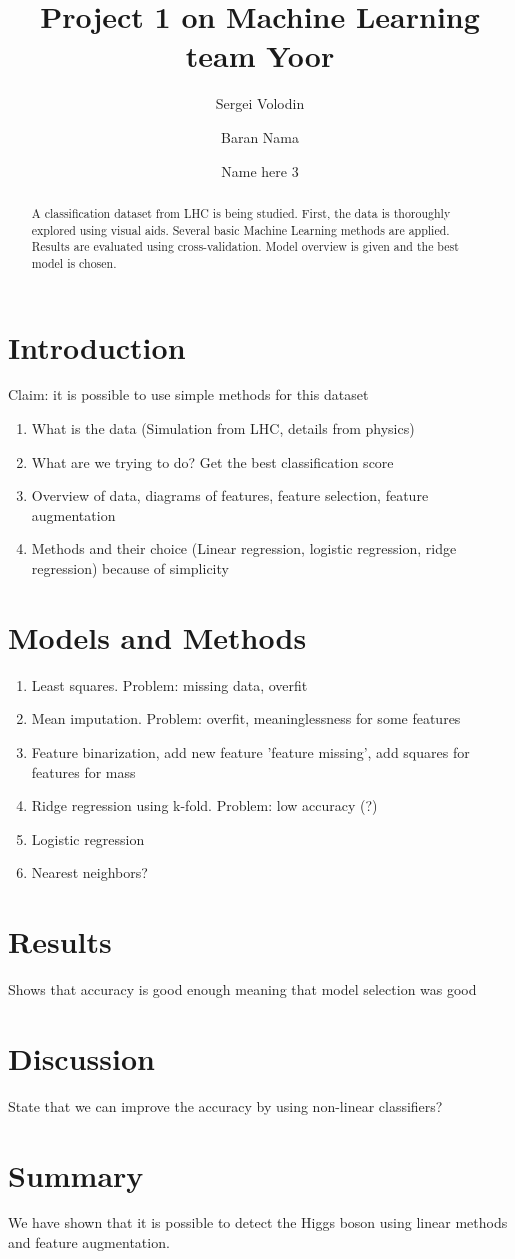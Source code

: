 \documentclass[10pt,conference,compsocconf]{IEEEtran}
\title{Project 1 on Machine Learning team Yoor}
\author[1]{Sergei Volodin}
\author[1]{Baran Nama}
\author[1]{Name here 3}
\affil[1]{EPFL}
\affil[ ]{\textit {\{sergei.volodin,baran.nama,email3\}@epfl.ch}}
\begin{document}
\maketitle

\begin{abstract}
A classification dataset from LHC is being studied. First, the data is thoroughly explored using visual aids. Several basic Machine Learning methods are applied. Results are evaluated using cross-validation. Model overview is given and the best model is chosen.
\end{abstract}

\section{Introduction}
Claim: it is possible to use simple methods for this dataset
\begin{enumerate}
	\item What is the data (Simulation from LHC, details from physics)
	\item What are we trying to do? Get the best classification score
	\item Overview of data, diagrams of features, feature selection, feature augmentation
	\item Methods and their choice (Linear regression, logistic regression, ridge regression) because of simplicity
\end{enumerate}
\section{Models and Methods}
\begin{enumerate}
\item Least squares. Problem: missing data, overfit
\item Mean imputation. Problem: overfit, meaninglessness for some features
\item Feature binarization, add new feature 'feature missing', add squares for features for mass
\item Ridge regression using k-fold. Problem: low accuracy (?)
\item Logistic regression
\item Nearest neighbors?
\end{enumerate}
\section{Results}
Shows that accuracy is good enough meaning that model selection was good
\section{Discussion}
State that we can improve the accuracy by using non-linear classifiers?
\section{Summary}
We have shown that it is possible to detect the Higgs boson using linear methods and feature augmentation.
\end{document}
